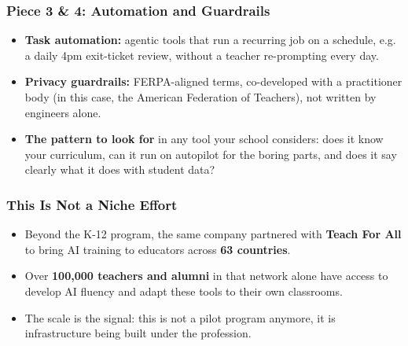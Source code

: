 \begin{frame}[fragile]\frametitle{Piece 3 \& 4: Automation and Guardrails}
\begin{itemize}
\item \textbf{Task automation:} agentic tools that run a recurring job on a schedule, e.g. a daily 4pm exit-ticket review, without a teacher re-prompting every day.
\item \textbf{Privacy guardrails:} FERPA-aligned terms, co-developed with a practitioner body (in this case, the American Federation of Teachers), not written by engineers alone.
\item \textbf{The pattern to look for} in any tool your school considers: does it know your curriculum, can it run on autopilot for the boring parts, and does it say clearly what it does with student data?
\end{itemize}
\end{frame}

\begin{frame}[fragile]\frametitle{This Is Not a Niche Effort}
\begin{itemize}
\item Beyond the K-12 program, the same company partnered with \textbf{Teach For All} to bring AI training to educators across \textbf{63 countries}.
\item Over \textbf{100,000 teachers and alumni} in that network alone have access to develop AI fluency and adapt these tools to their own classrooms.
\item The scale is the signal: this is not a pilot program anymore, it is infrastructure being built under the profession.
\end{itemize}
\end{frame}
